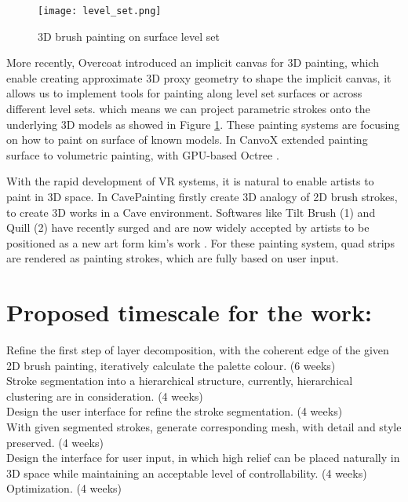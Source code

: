 \begin{figure}[H]
	\centering
	\texttt{[image: level\_set.png]}
	\caption{3D brush painting on surface level set}
	\label{level set}
\end{figure}

More recently, Overcoat \cite{schmid2011overcoat} introduced an implicit canvas for 3D painting, which enable creating approximate 3D proxy geometry to shape the implicit canvas, it allows us to implement tools for painting along level set surfaces or across different level sets. which means we can project parametric strokes onto the underlying 3D models as showed in Figure \ref{level set}.
These painting systems are focusing on how to paint on surface of known models. In CanvoX \cite{kim2017canvox} extended painting surface to volumetric painting, with GPU-based Octree \cite{lefebvre2005octree}.

With the rapid development of VR systems, it is natural to enable artists to paint in 3D space. In CavePainting \cite{keefe2001cavepainting} firstly create 3D analogy of 2D brush strokes, to create 3D works in a Cave environment. Softwares like Tilt Brush (1) and Quill (2) have recently surged and are now widely accepted by artists to be positioned as a new art form kim's work \cite{kim2017canvox}. For these painting system, quad strips are rendered as painting strokes, which are fully based on user input. \\
\section{Proposed timescale for the work:}
Refine the first step of layer decomposition, with the coherent edge of the given 2D brush painting, iteratively calculate the palette colour. (6 weeks)\\
Stroke segmentation into a hierarchical structure, currently,  hierarchical clustering are in consideration. (4 weeks)\\
Design the user interface for refine the stroke segmentation. (4 weeks)\\
With given segmented strokes, generate corresponding mesh, with detail and style preserved. (4 weeks)\\
Design the interface for user input, in which high relief can be placed naturally in 3D space while maintaining an acceptable level of controllability. (4 weeks)\\
Optimization.  (4 weeks)
\newline

